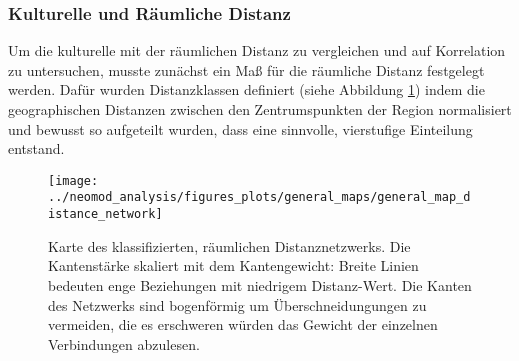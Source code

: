 \documentclass[openany,twoside,twocolumn]{book}
\begin{document}
\hypertarget{kulturelle-und-raumliche-distanz}{%
\subsubsection{Kulturelle und Räumliche
Distanz}\label{kulturelle-und-raumliche-distanz}}

Um die kulturelle mit der räumlichen Distanz zu vergleichen und auf
Korrelation zu untersuchen, musste zunächst ein Maß für die räumliche
Distanz festgelegt werden. Dafür wurden Distanzklassen definiert (siehe
Abbildung \ref{fig:map-regions-distance-classes}) indem die
geographischen Distanzen zwischen den Zentrumspunkten der Region
normalisiert und bewusst so aufgeteilt wurden, dass eine sinnvolle,
vierstufige Einteilung entstand.

\begin{figure}
\texttt{[image: ../neomod\_analysis/figures\_plots/general\_maps/general\_map\_distance\_network]} \caption[Karte des klassifizierten, räumlichen Distanznetzwerks]{Karte des klassifizierten, räumlichen Distanznetzwerks. Die Kantenstärke skaliert mit dem Kantengewicht: Breite Linien bedeuten enge Beziehungen mit niedrigem Distanz-Wert. Die Kanten des Netzwerks sind bogenförmig um Überschneidungungen zu vermeiden, die es erschweren würden das Gewicht der einzelnen Verbindungen abzulesen.}\label{fig:map-regions-distance-classes}
\end{figure}
\end{document}
